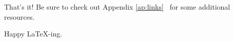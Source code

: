 That's it!
Be sure to check out Appendix \ref{ap:links}~ for some additional resources.
\par
Happy \LaTeX-ing.
